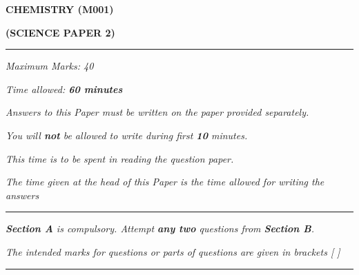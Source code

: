 \begin{center}
   \Large
   \textbf{CHEMISTRY (M001)}

   \textbf{(SCIENCE PAPER 2)}
   \rule{\textwidth}{0.4pt}
   \normalsize
   \textit{Maximum Marks: 40}

   \textit{Time allowed: \textbf{60 minutes}}

   \textit{Answers to this Paper must be written on the paper provided separately.}

   \textit{You will \textbf{not} be allowed to write during first \textbf{10} minutes.}

   \textit{This time is to be spent in reading the question paper.}

   \textit{The time given at the head of this Paper is the time allowed for writing the answers}
   \rule{\textwidth}{0.4pt}
   \small

   \textit{\textbf{Section A} is compulsory. Attempt \textbf{any two} questions from \textbf{Section B}.}

   \textit{The intended marks for questions or parts of questions are given in brackets [ ]}
   \rule{\textwidth}{0.4pt}
\end{center}
